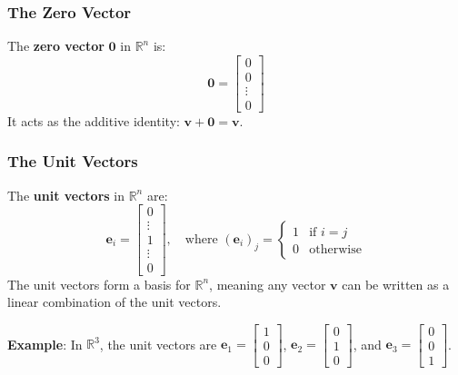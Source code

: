 \subsubsection{The Zero Vector}
The \textbf{zero vector} $ \mathbf{0} $ in $ \mathbb{R}^n $ is:
\begin{equation*}
    \mathbf{0} = \begin{bmatrix}0 \\ 0 \\ \vdots \\ 0\end{bmatrix}
\end{equation*}
It acts as the additive identity: $ \mathbf{v} + \mathbf{0} = \mathbf{v} $.

\subsubsection{The Unit Vectors}
The \textbf{unit vectors} in $ \mathbb{R}^n $ are:
\begin{equation*}
    \mathbf{e}_i = \begin{bmatrix}0 \\ \vdots \\ 1 \\ \vdots \\ 0\end{bmatrix}, \quad \text{where } (\mathbf{e}_{i})_j = \begin{cases} 1 & \text{if } i = j \\ 0 & \text{otherwise} \end{cases}
\end{equation*}
The unit vectors form a basis for $ \mathbb{R}^n $, meaning any vector $ \mathbf{v} $ can be written as a linear combination of the unit vectors.
\begin{exampleBox}
    \textbf{Example}: In $ \mathbb{R}^3 $, the unit vectors are $ \mathbf{e}_1 = \begin{bmatrix}1 \\ 0 \\ 0\end{bmatrix} $, $ \mathbf{e}_2 = \begin{bmatrix}0 \\ 1 \\ 0\end{bmatrix} $, and $ \mathbf{e}_3 = \begin{bmatrix}0 \\ 0 \\ 1\end{bmatrix} $.
\end{exampleBox}

